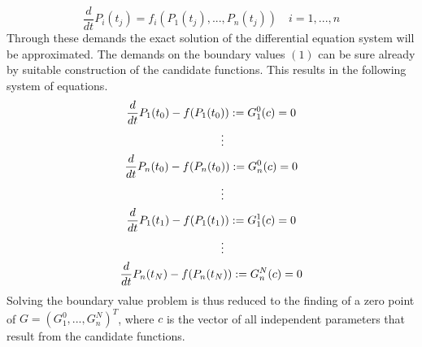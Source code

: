\documentclass[letterpaper,10pt,english]{sphinxmanual}
\begin{document}
\begin{equation}
   \frac{d}{d t} P_i(t_j) = f_i(P_1(t_j),...,P_n(t_j)) \quad i = 1,...,n
\end{equation}
Through these demands the exact solution of the differential equation system will be approximated.
The demands on the boundary values \((1)\) can be sure already by suitable
construction of the candidate functions. This results in the following system of equations.
\begin{gather}
\begin{split}\frac{d}{d t}P_1(t_0) - f(P_1(t_0)) := G_1^0(c) = 0\end{split}\notag\\\begin{split}\qquad \vdots\end{split}\notag\\\begin{split}\frac{d}{d t}P_n(t_0) - f(P_n(t_0)) := G_n^0(c) = 0\end{split}\notag\\\begin{split}\qquad \vdots\end{split}\notag\\\begin{split}\frac{d}{d t}P_1(t_1) - f(P_1(t_1)) := G_1^1(c) = 0\end{split}\notag\\\begin{split}\qquad \vdots\end{split}\notag\\\begin{split}\frac{d}{d t}P_n(t_N) - f(P_n(t_N)) := G_n^N(c) = 0\end{split}\notag
\end{gather}
Solving the boundary value problem is thus reduced to the finding of a zero point
of \(G = (G_1^0 ,..., G_n^N)^T\), where \(c\) is the vector of all independent
parameters that result from the candidate functions.
\end{document}
